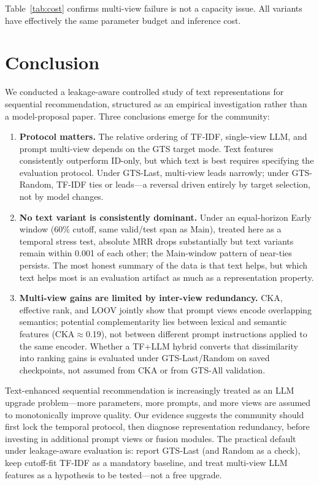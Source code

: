 \documentclass[sigconf,natbib=true,anonymous]{acmart}
\newcommand{\tfidf}{\textsc{TF-IDF}\xspace}
\newcommand{\llm}{\textsc{LLM}\xspace}
\begin{document}
Table~\ref{tab:cost} confirms multi-view failure is not a capacity issue.  All variants have effectively the same parameter budget and inference cost.

\section{Conclusion}
\label{sec:conclusion}

We conducted a leakage-aware controlled study of text representations for sequential recommendation, structured as an empirical investigation rather than a model-proposal paper.
Three conclusions emerge for the community:

\begin{enumerate}[leftmargin=*,itemsep=1pt]
\item \textbf{Protocol matters.}
The relative ordering of \tfidf, single-view \llm, and prompt multi-view depends on the GTS target mode.
Text features consistently outperform ID-only, but which text is best requires specifying the evaluation protocol.
Under GTS-Last, multi-view leads narrowly; under GTS-Random, \tfidf ties or leads---a reversal driven entirely by target selection, not by model changes.
\item \textbf{No text variant is consistently dominant.}
Under an equal-horizon Early window ($60\%$ cutoff, same valid/test span as Main), treated here as a temporal stress test, absolute MRR drops substantially but text variants remain within 0.001 of each other; the Main-window pattern of near-ties persists.
The most honest summary of the data is that text helps, but which text helps most is an evaluation artifact as much as a representation property.
\item \textbf{Multi-view gains are limited by inter-view redundancy.}
CKA, effective rank, and LOOV jointly show that prompt views encode overlapping semantics; potential complementarity lies between lexical and semantic features (CKA$\approx$0.19), not between different prompt instructions applied to the same encoder.
Whether a TF+LLM hybrid converts that dissimilarity into ranking gains is evaluated under GTS-Last/Random on saved checkpoints, not assumed from CKA or from GTS-All validation.
\end{enumerate}

Text-enhanced sequential recommendation is increasingly treated as an LLM upgrade problem---more parameters, more prompts, and more views are assumed to monotonically improve quality.
Our evidence suggests the community should first lock the temporal protocol, then diagnose representation redundancy, before investing in additional prompt views or fusion modules.
The practical default under leakage-aware evaluation is: report GTS-Last (and Random as a check), keep cutoff-fit \tfidf as a mandatory baseline, and treat multi-view LLM features as a hypothesis to be tested---not a free upgrade.
\end{document}
